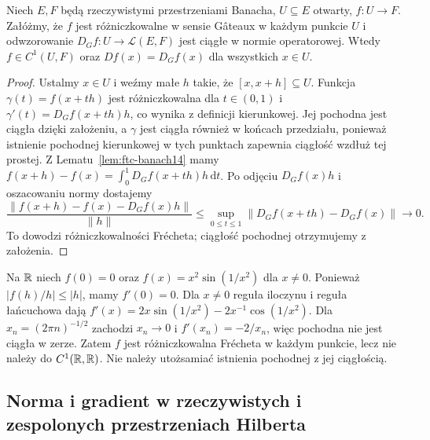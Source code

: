 \begin{twierdzenie}
\label{thm:continuous-gateaux14}
Niech $E,F$ będą rzeczywistymi przestrzeniami Banacha, $U\subseteq E$ otwarty, $f:U\to F$. Załóżmy, że $f$ jest różniczkowalne w sensie Gâteaux w każdym punkcie $U$ i odwzorowanie $D_Gf:U\to\mathcal L(E,F)$ jest ciągłe w normie operatorowej. Wtedy $f\in C^1(U,F)$ oraz $Df(x)=D_Gf(x)$ dla wszystkich $x\in U$.
\end{twierdzenie}
\begin{proof}
Ustalmy $x\in U$ i weźmy małe $h$ takie, że $[x,x+h]\subseteq U$. Funkcja $\gamma(t)=f(x+th)$ jest różniczkowalna dla $t\in(0,1)$ i $\gamma'(t)=D_Gf(x+th)h$, co wynika z definicji kierunkowej. Jej pochodna jest ciągła dzięki założeniu, a $\gamma$ jest ciągła również w końcach przedziału, ponieważ istnienie pochodnej kierunkowej w tych punktach zapewnia ciągłość wzdłuż tej prostej. Z Lematu~\ref{lem:ftc-banach14} mamy
$f(x+h)-f(x)=\int_0^1 D_Gf(x+th)h\,\mathrm dt$.
Po odjęciu $D_Gf(x)h$ i oszacowaniu normy dostajemy
\[
\frac{\|f(x+h)-f(x)-D_Gf(x)h\|}{\|h\|}
\le\sup_{0\le t\le1}\|D_Gf(x+th)-D_Gf(x)\|\longrightarrow0.
\]
To dowodzi różniczkowalności Frécheta; ciągłość pochodnej otrzymujemy z założenia.
\end{proof}

\begin{przyklad}
\label{ex:derivative-noncontinuous14}
Na $\mathbb R$ niech $f(0)=0$ oraz $f(x)=x^2\sin(1/x^2)$ dla $x\ne0$. Ponieważ $|f(h)/h|\le|h|$, mamy $f'(0)=0$. Dla $x\ne0$ reguła iloczynu i reguła łańcuchowa dają $f'(x)=2x\sin(1/x^2)-2x^{-1}\cos(1/x^2)$. Dla $x_n=(2\pi n)^{-1/2}$ zachodzi $x_n\to0$ i $f'(x_n)=-2/x_n$, więc pochodna nie jest ciągła w zerze. Zatem $f$ jest różniczkowalna Frécheta w każdym punkcie, lecz nie należy do $C^1(\mathbb R,\mathbb R)$. Nie należy utożsamiać istnienia pochodnej z jej ciągłością.
\end{przyklad}

\subsection{Norma i gradient w rzeczywistych i zespolonych przestrzeniach Hilberta}

